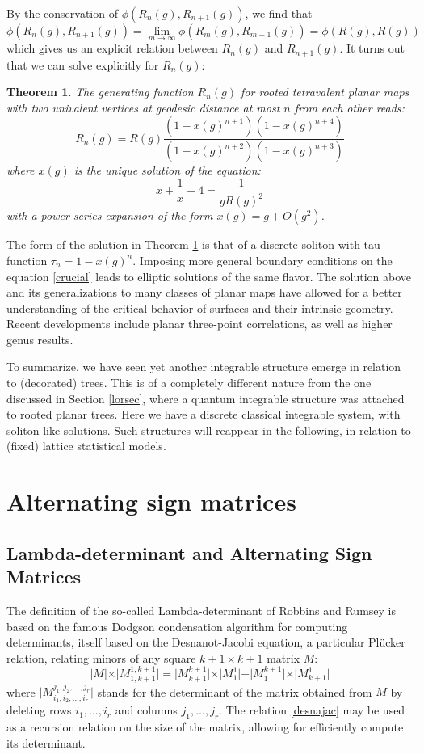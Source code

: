 \documentclass[12pt]{amsart}
\newtheorem{thm}{Theorem}[section]
\numberwithin{equation}{section}
\begin{document}
By the conservation of $\phi(R_n(g),R_{n+1}(g))$, we find that 
$$ \phi(R_n(g),R_{n+1}(g))=\lim_{m\to\infty} \phi(R_m(g),R_{m+1}(g))=\phi(R(g),R(g))$$
which gives us an explicit relation between $R_n(g)$ and $R_{n+1}(g)$. It turns out that we can
solve explicitly for $R_n(g)$:

\begin{thm}\cite{GEOD}\label{geodthm}
The generating function $R_n(g)$ for rooted tetravalent planar maps with two univalent vertices
at geodesic distance at most $n$ from each other reads:
$$ R_n(g)=R(g) \frac{(1-x(g)^{n+1})(1-x(g)^{n+4})}{(1-x(g)^{n+2})(1-x(g)^{n+3})} $$
where $x(g)$ is the unique solution of the equation:
$$ x+\frac{1}{x}+4=\frac{1}{g R(g)^2} $$
with a power series expansion of the form $x(g)=g+O(g^2)$.
\end{thm}

The form of the solution in Theorem \ref{geodthm} is that of a discrete soliton with tau-function $\tau_n=1-x(g)^n$.
Imposing more general boundary conditions on the equation \eqref{crucial} leads to elliptic solutions of the same flavor.
The solution above and its generalizations to many classes of planar maps have allowed for a better understanding
of the critical behavior of surfaces and their intrinsic geometry. Recent developments include planar three-point
correlations, as well as higher genus results.

To summarize, we have seen yet another integrable structure emerge in relation to (decorated) trees.
This is of a completely different nature from the one discussed in Section \ref{lorsec}, 
where a quantum integrable structure
was attached to rooted planar trees. Here we have a discrete classical integrable system, with soliton-like solutions.
Such structures will reappear in the following, in relation to (fixed) lattice statistical models.

\section{Alternating sign matrices}

\subsection{Lambda-determinant and Alternating Sign Matrices}

The definition of the so-called Lambda-determinant of Robbins and Rumsey \cite{RR} is based on the famous
Dodgson condensation algorithm \cite{DOD} for computing determinants, itself based on the Desnanot-Jacobi
equation, a particular Pl\"ucker relation, relating minors of any square $k+1\times k+1$ matrix $M$:
\begin{equation}\label{desnajac}
\vert M\vert \times \vert M_{1,k+1}^{1,k+1}\vert=\vert M_{k+1}^{k+1}\vert \times \vert M_1^1\vert -
\vert M_1^{k+1}\vert \times \vert M_{k+1}^1\vert
\end{equation}
where $\vert M_{i_1,i_2,...,i_r}^{j_1,j_2,...,j_r}\vert$ stands for the determinant of the matrix obtained from $M$
by deleting rows $i_1,...,i_r$ and columns $j_1,...,j_r$. The relation \eqref{desnajac} may be used as a
recursion relation on the size of the matrix, allowing for efficiently compute its determinant.
\end{document}
